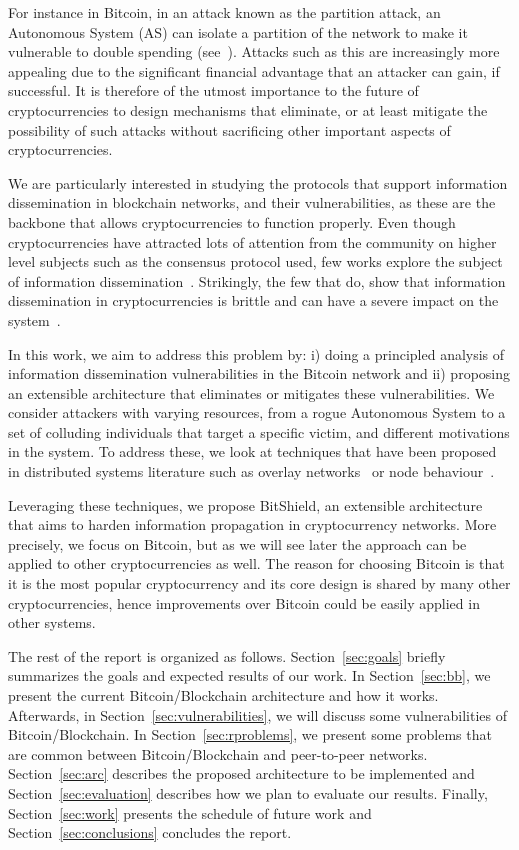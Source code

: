 For instance in Bitcoin, in an attack known as the partition attack,  an Autonomous System (AS) can isolate a partition of the network to make it vulnerable to double spending (see~\cite{apostolaki2016hijacking}).
Attacks such as this are increasingly more appealing due to the significant financial advantage that an attacker can gain, if successful.
It is therefore of the utmost importance to the future of cryptocurrencies to design mechanisms that eliminate, or at least mitigate the possibility of such attacks without sacrificing other important aspects of cryptocurrencies.

We are particularly interested in studying the protocols that support information dissemination in blockchain networks, and their vulnerabilities, as these are the backbone that allows cryptocurrencies to function properly.
Even though cryptocurrencies have attracted lots of attention from the community on higher level subjects such as the consensus protocol used, few works explore the subject of information dissemination~\cite{miller2015discovering}.
Strikingly, the few that do, show that information dissemination in cryptocurrencies is brittle and can have a severe impact on the system~\cite{miller2015discovering}.

In this work, we aim to address this problem by: i) doing a principled analysis of information dissemination vulnerabilities in the Bitcoin network and ii) proposing an extensible architecture that eliminates or mitigates these vulnerabilities.
We consider attackers with varying resources, from a rogue Autonomous System to a set of colluding individuals that target a specific victim, and different motivations in the system.
To address these, we look at techniques that have been proposed in distributed systems literature such as overlay networks~\cite{jesi2009secure} or node behaviour~\cite{li2006bar}.

Leveraging these techniques, we propose BitShield, an extensible architecture that aims to harden information propagation in cryptocurrency networks. More precisely, we focus on Bitcoin, but as we will see later the approach can be applied to other cryptocurrencies as well. The reason for choosing Bitcoin is that it is the most popular cryptocurrency and its core design is shared by many other cryptocurrencies, hence improvements over Bitcoin could be easily applied in other systems.

The rest of the report is organized as follows.  Section~\ref{sec:goals} briefly summarizes the goals and expected results of our work. In Section~\ref{sec:bb}, we present the current Bitcoin/Blockchain architecture and how it works. Afterwards, in Section~\ref{sec:vulnerabilities}, we will discuss some vulnerabilities of Bitcoin/Blockchain. In Section~\ref{sec:rproblems}, we present some problems that are common between Bitcoin/Blockchain and peer-to-peer networks.  Section~\ref{sec:arc} describes the proposed architecture to be implemented and Section~\ref{sec:evaluation} describes how we plan to evaluate our results. Finally, Section~\ref{sec:work} presents the schedule of future work and Section~\ref{sec:conclusions} concludes the report.

